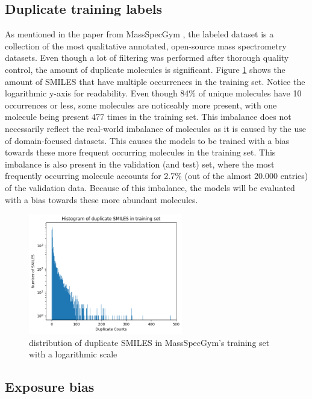 \subsection{Duplicate training labels}
As mentioned in the paper from MassSpecGym \cite{bushuiev2024massspecgym}, the labeled dataset is a collection of the most qualitative annotated, open-source mass spectrometry datasets.
Even though a lot of filtering was performed after thorough quality control, the amount of duplicate molecules is significant.
Figure \ref{fig:duplicate_smiles} shows the amount of SMILES that have multiple occurrences in the training set. Notice the logarithmic y-axis for readability.
Even though 84\% of unique molecules have 10 occurrences or less, some molecules are noticeably more present, with one molecule being present 477 times in the training set.
This imbalance does not necessarily reflect the real-world imbalance of molecules as it is caused by the use of domain-focused datasets.
This causes the models to be trained with a bias towards these more frequent occurring molecules in the training set.
This imbalance is also present in the validation (and test) set, where the most frequently occurring molecule accounts for 2.7\% (out of the almost 20.000 entries) of the validation data.
Because of this imbalance, the models will be evaluated with a bias towards these more abundant molecules.
\begin{figure}[h]
    \centering
    \includegraphics[width=0.6\textwidth]{figures/discussion/duplicate_smiles_training_set.png}
    \caption{distribution of duplicate SMILES in MassSpecGym's training set with a logarithmic scale}
    \label{fig:duplicate_smiles}
\end{figure}

\subsection{Exposure bias}

